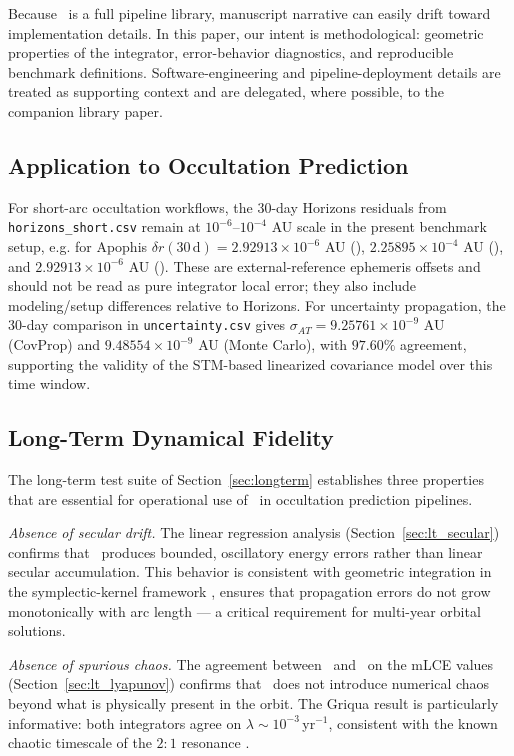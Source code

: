 Because \astdyn\ is a full pipeline library, manuscript narrative can
easily drift toward implementation details. In this paper, our intent
is methodological: geometric properties of the integrator,
error-behavior diagnostics, and reproducible benchmark definitions.
Software-engineering and pipeline-deployment details are treated as
supporting context and are delegated, where possible, to the
companion library paper.

\subsection{Application to Occultation Prediction}
\label{sec:occultation}

For short-arc occultation workflows, the 30-day Horizons residuals
from \texttt{horizons\_short.csv} remain at
$10^{-6}$--$10^{-4}$ AU scale in the present benchmark setup, e.g.
for Apophis $\delta r(30\,\mathrm{d})=2.92913\times10^{-6}$ AU
(\AAS), $2.25895\times10^{-4}$ AU (\saba), and
$2.92913\times10^{-6}$ AU (\rkf).
These are external-reference ephemeris offsets and should not be read
as pure integrator local error; they also include modeling/setup
differences relative to Horizons.
For uncertainty propagation, the 30-day comparison in
\texttt{uncertainty.csv} gives
$\sigma_{AT}=9.25761\times10^{-9}$ AU (CovProp) and
$9.48554\times10^{-9}$ AU (Monte Carlo), with
$97.60\%$ agreement, supporting the validity of the STM-based
linearized covariance model over this time window.

\subsection{Long-Term Dynamical Fidelity}
\label{sec:lt_discussion}

The long-term test suite of Section~\ref{sec:longterm}
establishes three properties that are essential for
operational use of \AAS\ in occultation prediction pipelines.

\textit{Absence of secular drift.} The linear regression
analysis (Section~\ref{sec:lt_secular}) confirms that
\AAS\ produces bounded, oscillatory energy errors rather
than linear secular accumulation. This behavior is consistent
with geometric integration in the symplectic-kernel framework
\citep{HairerLubichWanner2006},
ensures that propagation errors do not grow monotonically
with arc length --- a critical requirement for multi-year
orbital solutions.

\textit{Absence of spurious chaos.} The agreement between
\AAS\ and \rkf\ on the mLCE values
(Section~\ref{sec:lt_lyapunov}) confirms that \AAS\ does
not introduce numerical chaos beyond what is physically
present in the orbit. The Griqua result is particularly
informative: both integrators agree on $\lambda \sim
10^{-3}$\,yr$^{-1}$, consistent with the known chaotic
timescale of the $2:1$ resonance \citep{ferrazmello1994}.

